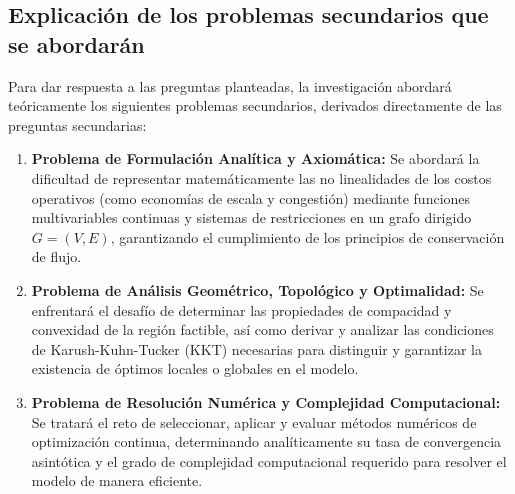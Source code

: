 \subsection{Explicación de los problemas secundarios que se abordarán}
Para dar respuesta a las preguntas planteadas, la investigación abordará teóricamente los siguientes problemas secundarios, derivados directamente de las preguntas secundarias:
\begin{enumerate}
    \item \textbf{Problema de Formulación Analítica y Axiomática:} Se abordará la dificultad de representar matemáticamente las no linealidades de los costos operativos (como economías de escala y congestión) mediante funciones multivariables continuas y sistemas de restricciones en un grafo dirigido $G=(V,E)$, garantizando el cumplimiento de los principios de conservación de flujo.
    \item \textbf{Problema de Análisis Geométrico, Topológico y Optimalidad:} Se enfrentará el desafío de determinar las propiedades de compacidad y convexidad de la región factible, así como derivar y analizar las condiciones de Karush-Kuhn-Tucker (KKT) necesarias para distinguir y garantizar la existencia de óptimos locales o globales en el modelo.
    \item \textbf{Problema de Resolución Numérica y Complejidad Computacional:} Se tratará el reto de seleccionar, aplicar y evaluar métodos numéricos de optimización continua, determinando analíticamente su tasa de convergencia asintótica y el grado de complejidad computacional requerido para resolver el modelo de manera eficiente.
\end{enumerate}
